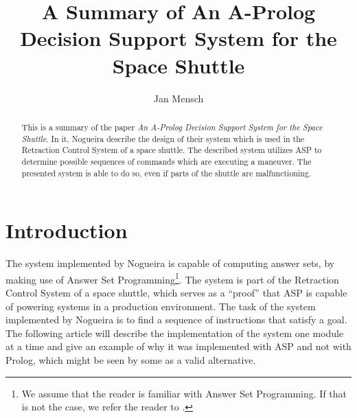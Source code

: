 \documentclass[runningheads]{llncs}
\newcommand{\papertitle}{An A-Prolog Decision Support System for the Space Shuttle}
\newcommand{\authorquote}{Nogueira \etal}
\begin{document}
\title{A Summary of \papertitle}

\author{Jan Mensch}




%
\maketitle              %
%
\begin{abstract}
This is a summary of the paper \textit{\papertitle}\cite{nogueira2001prolog}. In it, \authorquote{} describe the design of their system which is used in the Retraction Control System of a space shuttle. The described system utilizes ASP to determine possible sequences of commands which are executing a maneuver. The presented system is able to do so, even if parts of the shuttle are malfunctioning. 


\end{abstract}

\section{Introduction} \label{sec:intro}

The system implemented by \authorquote{} is capable of computing answer sets, by making use of Answer Set Programming\footnote{We assume that the reader is familiar with Answer Set Programming. If that is not the case, we refer the reader to \cite{erdem2016applications}.}. The system is part of the Retraction Control System of a space shuttle, which serves as a ``proof'' that ASP is capable of powering systems in a production environment. The task of the system implemented by \authorquote{} is to find a sequence of instructions that satisfy a goal. The following article will describe the implementation of the system one module at a time and give an example of why it was implemented with ASP and not with Prolog, which might be seen by some as a valid alternative.
\end{document}
